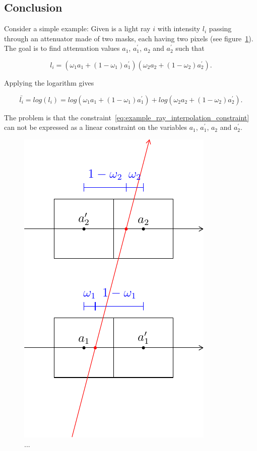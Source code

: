 \documentclass[11pt,a4paper,titlepage]{article}
\begin{document}
\subsection{Conclusion}

Consider a simple example: Given is a light ray $i$ with intensity $l_i$ passing through an attenuator made of two masks, each having two pixels (see figure~\ref{fig:problem_with_ray_space_interpolation}). The goal is to find attenuation values $a_1$, $a_1^\prime$, $a_2$ and $a_2^\prime$ such that

\begin{equation}
	l_i = \left(\omega_1 a_1 + \left(1 - \omega_1\right) a_1^{\prime}\right) \left(\omega_2 a_2 + \left(1 - \omega_2\right) a_2^{\prime} \right).
\end{equation}

Applying the logarithm gives

\begin{equation}\label{eq:example_ray_interpolation_constraint}
	\bar{l_i} = log\left(l_i\right) = log\left(\omega_1 a_1 + \left(1 - \omega_1\right) a_1^{\prime}\right) + log\left(\omega_2 a_2 + \left(1 - \omega_2\right) a_2^{\prime} \right).
\end{equation}

The problem is that the constraint~\ref{eq:example_ray_interpolation_constraint} can not be expressed as a linear constraint on the variables $a_1$, $a_1^\prime$, $a_2$ and $a_2^\prime$.

\begin{figure}
	\centering
	\includegraphics[scale=1]{sketches/ray_space_interpolation.pdf}
	\caption{...}
	\label{fig:problem_with_ray_space_interpolation}
\end{figure}
\end{document}
